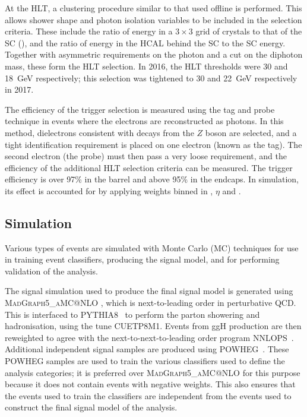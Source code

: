 At the HLT, a clustering procedure similar to that used offline is performed. 
This allows shower shape and photon isolation variables to be included in the selection criteria.
These include the ratio of energy in a $3\times3$ grid of crystals to that of the SC (\RNINE), 
and the ratio of energy in the HCAL behind the SC to the SC energy.
Together with asymmetric requirements on the photon \pt and a cut on the diphoton mass, 
these form the HLT selection.
In 2016, the HLT \pt thresholds were 30 and \SI{18}{GeV} respectively;
this selection was tightened to 30 and \SI{22}{GeV} respectively in 2017.

The efficiency of the trigger selection is measured using the tag and probe technique in \Zee events where the electrons are reconstructed as photons.
In this method, dielectrons consistent with decays from the $Z$ boson are selected, 
and a tight identification requirement is placed on one electron (known as the tag).
The second electron (the probe) must then pass a very loose requirement, 
and the efficiency of the additional HLT selection criteria can be measured.
The trigger efficiency is over 97\% in the barrel and above 95\% in the endcaps.
In simulation, its effect is accounted for by applying weights binned in \pt, $\eta$ and \RNINE.

\subsection{Simulation}

Various types of events are simulated with Monte Carlo (MC) techniques for use in training event classifiers, 
producing the signal model, and for performing validation of the analysis.

The signal simulation used to produce the final signal model is generated using \textsc{MadGraph5_{}aMC@NLO} \cite{Madgraph}, 
which is next-to-leading order in perturbative QCD.
This is interfaced to \textsc{PYTHIA8}~\cite{pythia} to perform the parton showering and hadronisation, 
using the tune \textsc{CUETP8M1}.
Events from ggH production are then reweighted to agree with the next-to-next-to-leading order program \textsc{NNLOPS}~\cite{NNLOPS}.
Additional independent signal samples are produced using \textsc{POWHEG}~\cite{powheg}. 
These \textsc{POWHEG} samples are used to train the various classifiers 
used to define the analysis categories; 
it is preferred over \textsc{MadGraph5_{}aMC@NLO} for this purpose 
because it does not contain events with negative weights.
This also ensures that the events used to train the classifiers are independent 
from the events used to construct the final signal model of the analysis.

